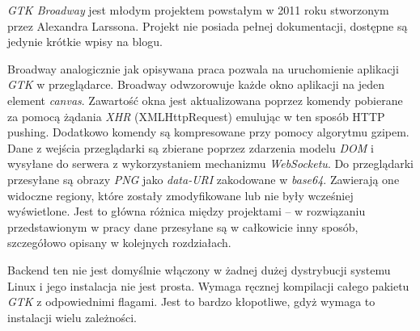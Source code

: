 \emph{GTK Broadway} jest młodym projektem powstałym w 2011 roku stworzonym przez Alexandra Larssona. Projekt nie posiada pełnej dokumentacji, dostępne są jedynie krótkie wpisy na blogu\cite{broadway1,broadway2}.

Broadway analogicznie jak opisywana praca pozwala na uruchomienie aplikacji \emph{GTK} w przeglądarce. Broadway odwzorowuje każde okno aplikacji na jeden element \emph{canvas}. Zawartość okna jest aktualizowana poprzez komendy pobierane za pomocą żądania \emph{XHR} (XMLHttpRequest) emulując w ten sposób HTTP pushing. Dodatkowo komendy są kompresowane przy pomocy algorytmu gzipem. Dane z wejścia przeglądarki są zbierane poprzez zdarzenia modelu \emph{DOM} i wysyłane do serwera z wykorzystaniem mechanizmu \emph{WebSocketu}. Do przeglądarki przesyłane są obrazy \emph{PNG} jako \emph{data-URI} zakodowane w \emph{base64}. Zawierają one widoczne regiony, które zostały zmodyfikowane lub nie były wcześniej wyświetlone. Jest to główna różnica między projektami -- w rozwiązaniu przedstawionym w pracy dane przesyłane są w całkowicie inny sposób, szczegółowo opisany w kolejnych rozdziałach.

Backend ten nie jest domyślnie włączony w żadnej dużej dystrybucji systemu Linux i jego instalacja nie jest prosta. Wymaga ręcznej kompilacji całego pakietu \emph{GTK} z odpowiednimi flagami. Jest to bardzo kłopotliwe, gdyż wymaga to instalacji wielu zależności.